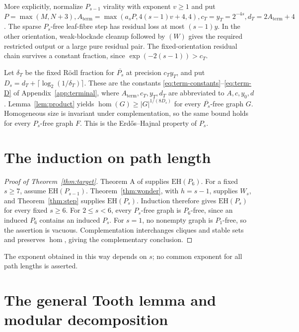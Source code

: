 \documentclass[11pt,a4paper]{article}
\theoremstyle{definition}
\theoremstyle{remark}
\numberwithin{equation}{section}
\newcommand{\EH}{\mathrm{EH}}
\begin{document}
More explicitly, normalize \(P_{s-1}\) virality with exponent \(v\ge\allowbreak 1\) and put \(P=\max (M,\allowbreak N+3),\allowbreak  A_{\mathrm{term}}=\max (a_{s} P,\allowbreak 4(s-1)v+4,\allowbreak 4),\allowbreak  c_{T}=y_{T}=2^{-4s},\allowbreak  d_{T}=2A_{\mathrm{term}}+4\). The sparse \(P_{s}\)-free leaf-fibre step has residual loss at most \((s-1)y\). In the other orientation, weak-blockade cleanup followed by \((W)\) gives the required restricted output or a large pure residual pair. The fixed-orientation residual chain survives a constant fraction, since \(\exp (-2(s-1))>c_{T}\).

Let \(\delta_{T}\) be the fixed R\"odl fraction for \(\overline{P_{s}}\) at precision \(c_{T}y_{T}\), and put \(D_{s}=d_{T}+\lceil \log _{2}(1/\delta_{T})\rceil\). These are the constants \eqref{eq:term-constants}--\eqref{eq:term-D} of Appendix~\ref{app:terminal}, where \(A_{\mathrm{term}},c_{T},y_{T},d_{T}\) are abbreviated to \(A,c,y_0,d\). Lemma~\ref{lem:product} yields \(\hom (G)\ge\allowbreak |G|^{1/(8D_{s})}\) for every \(\overline{P_{s}}\)-free graph \(G\). Homogeneous size is invariant under complementation, so the same bound holds for every \(P_{s}\)-free graph \(F\). This is the Erd\H{o}s--Hajnal property of \(P_{s}\).

\section{The induction on path length}\label{sec:assembly}
\begin{proof}[Proof of Theorem~\ref{thm:target}]
Theorem A of \cite{p6} supplies \(\EH(P_6)\). For a fixed \(s\ge7\), assume \(\EH(P_{s-1})\). Theorem~\ref{thm:wonder}, with \(h=s-1\), supplies \(W_s\), and Theorem~\ref{thm:step} supplies \(\EH(P_s)\). Induction therefore gives \(\EH(P_s)\) for every fixed \(s\ge6\). For \(2\le s<6\), every \(P_s\)-free graph is \(P_6\)-free, since an induced \(P_6\) contains an induced \(P_s\). For \(s=1\), no nonempty graph is \(P_1\)-free, so the assertion is vacuous. Complementation interchanges cliques and stable sets and preserves \(\hom\), giving the complementary conclusion.
\end{proof}
The exponent obtained in this way depends on \(s\); no common exponent for all path lengths is asserted.
\clearpage\appendix


\section{The general Tooth lemma and modular decomposition}\label{app:tooth}
\end{document}
